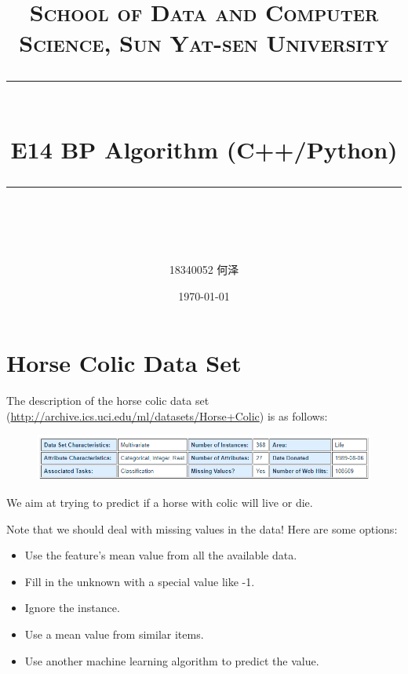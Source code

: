 \documentclass[a4paper, 11pt]{article}
\title{	
\normalfont \normalsize
\textsc{School of Data and Computer Science, Sun Yat-sen University} \\ [25pt] %
\rule{\textwidth}{0.5pt} \\[0.4cm] %
\huge  E14 BP Algorithm (C++/Python)\\ %
\rule{\textwidth}{2pt} \\[0.5cm] %
\author{18340052  何泽}
\date{\normalsize\today}
}
\begin{document}
\maketitle
\tableofcontents
\newpage
\section{Horse Colic Data Set}
The description of the horse colic data set (\url{http://archive.ics.uci.edu/ml/datasets/Horse+Colic}) is as follows:
\begin{figure}[ht]
\centering
\includegraphics[width=15cm]{horse}
\end{figure}

We aim at trying to predict if a horse with colic will live or die.

Note that we should deal with missing values in the data! Here are some options:
\begin{itemize}
	\item Use the feature’s mean value from all the available data.
	\item Fill in the unknown with a special value like -1.
	\item Ignore the instance.
	\item Use a mean value from similar items.
	\item Use another machine learning algorithm to predict the value.
\end{itemize}
\end{document}
